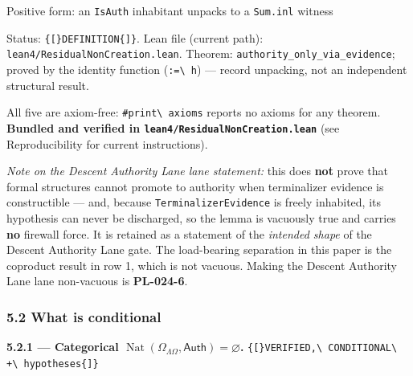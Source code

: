 \documentclass[
  10pt,
]{article}
\DeclareRobustCommand{\texttt}[1]{{\paperSymbolFont\nolinkurl{#1}}}
\begin{document}
Positive form: an \texttt{IsAuth} inhabitant unpacks to a \texttt{Sum.inl} witness

Status: \texttt{{[}DEFINITION{]}}. Lean file (current path): \texttt{lean4/ResidualNonCreation.lean}. Theorem: \texttt{authority\_only\_via\_evidence}; proved by the identity function (\texttt{:=\ h}) --- record unpacking, not an independent structural result.

All five are axiom-free: \texttt{\#print\ axioms} reports no axioms for any theorem. \textbf{Bundled and verified in \texttt{lean4/ResidualNonCreation.lean}} (see Reproducibility for current instructions).

\emph{Note on the Descent Authority Lane lane statement:} this does \textbf{not} prove that formal structures cannot promote to authority when terminalizer evidence is constructible --- and, because \texttt{TerminalizerEvidence} is freely inhabited, its hypothesis can never be discharged, so the lemma is vacuously true and carries \textbf{no} firewall force. It is retained as a statement of the \emph{intended shape} of the Descent Authority Lane gate. The load-bearing separation in this paper is the coproduct result in row 1, which is not vacuous. Making the Descent Authority Lane lane non-vacuous is \textbf{PL-024-6}.

\subsubsection{5.2 What is conditional}\label{what-is-conditional}

\textbf{5.2.1 --- Categorical \protect\hypertarget{math-E0003-0111}{}{\(\operatorname{Nat}(\Omega_{\Lambda\Omega}, \mathsf{Auth}) = \varnothing\)}.} \texttt{{[}VERIFIED,\ CONDITIONAL\ +\ hypotheses{]}}
\end{document}
